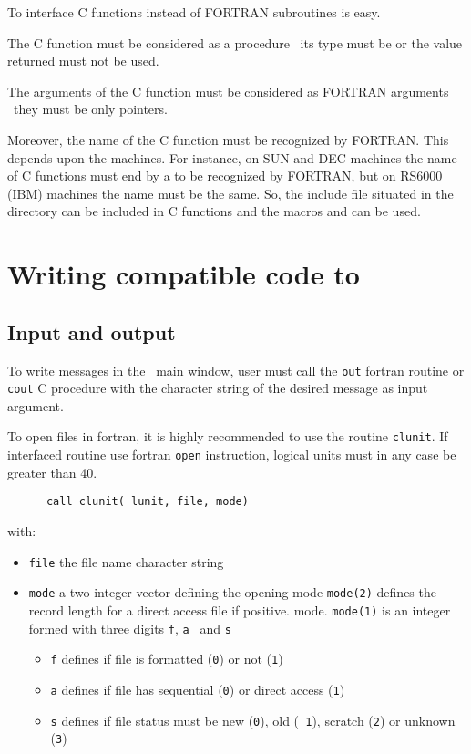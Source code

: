 To interface C functions instead of FORTRAN subroutines is easy.

The C function must be considered as a procedure \ie\
its type must be  or the value returned must not be used.

The arguments of the C function must be considered as FORTRAN arguments \ie\
they must be only pointers.

Moreover, the name of the C function must be recognized by FORTRAN. This
depends upon the machines. For instance, on SUN and DEC machines the name of C
functions must end by a \T{\_} to be recognized by FORTRAN, but on RS6000
(IBM) machines the name must be the same. So, the include file \T{machine.h}
situated in the
directory \M{\SCI\ directory}\T{/routines} can be included in C functions and
the macros  and  can be used.

\section{Writing compatible code to \SCI}
\label{compat}

\subsection{Input and output}
To write messages in the  \SCI\ main window, user  must call the
{\tt out} fortran routine or {\tt cout} C procedure with the
character string of the desired message as input argument.

To open files in fortran, it is highly recommended to  use the \SCI
routine {\tt   clunit}. If interfaced routine use fortran {\tt open}
instruction, logical units must in any case be greater than 40.
\begin{verbatim}
      call clunit( lunit, file, mode)
\end{verbatim}
with:
\begin{itemize}
\item {\tt file} the file name character string
\item {\tt mode} a two integer vector defining the opening mode
 {\tt mode(2)} defines the record length for a direct access file if
 positive. 
 mode.
{\tt mode(1)} is an integer formed with three digits {\tt f}, {\tt a }
and {\tt s}
\begin{itemize}
\item {\tt f} defines if file is formatted ({\tt 0}) or not ({\tt 1})
\item {\tt a} defines if file has sequential ({\tt 0}) or direct
  access ({\tt 1})
\item {\tt s} defines if file status must be new ({\tt 0}), old ({\tt
    1}), scratch ({\tt 2}) or unknown ({\tt 3})
\end{itemize}
\end{itemize}

